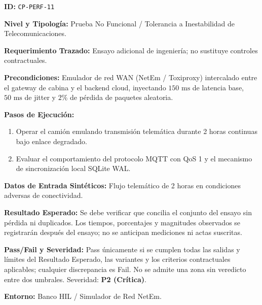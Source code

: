 \par\noindent\textbf{ID:} \texttt{C\allowbreak{}P\allowbreak{}-\allowbreak{}P\allowbreak{}E\allowbreak{}R\allowbreak{}F\allowbreak{}-\allowbreak{}1\allowbreak{}1\allowbreak{}}\par
\par\noindent\textbf{Nivel y Tipología:} Prueba No Funcional / Tolerancia a Inestabilidad de Telecomunicaciones.\par
\par\noindent\textbf{Requerimiento Trazado:} Ensayo adicional de ingeniería; no sustituye controles contractuales.\par
\par\noindent\textbf{Precondiciones:} Emulador de red WAN (NetEm / Toxiproxy) intercalado entre el gateway de cabina y el backend cloud, inyectando \(150\text{ ms}\) de latencia base, \(50\text{ ms}\) de jitter y \(2\%\) de pérdida de paquetes aleatoria.\par
\par\noindent\textbf{Pasos de Ejecución:} \par
\begin{enumerate}
\item Operar el camión emulando transmisión telemática durante 2 horas continuas bajo enlace degradado.
\item Evaluar el comportamiento del protocolo MQTT con QoS 1 y el mecanismo de sincronización local SQLite WAL.
\end{enumerate}
\par\noindent\textbf{Datos de Entrada Sintéticos:} Flujo telemático de 2 horas en condiciones adversas de conectividad.\par
\par\noindent\textbf{Resultado Esperado:} Se debe verificar que concilia el conjunto del ensayo sin pérdida ni duplicados. Los tiempos, porcentajes y magnitudes observados se registrarán después del ensayo; no se anticipan mediciones ni actas suscritas.\par
\par\noindent\textbf{Pass/Fail y Severidad:} Pass únicamente si se cumplen todas las salidas y límites del Resultado Esperado, las variantes y los criterios contractuales aplicables; cualquier discrepancia es Fail. No se admite una zona sin veredicto entre dos umbrales. Severidad: \textbf{P2 (Crítica)}.\par
\par\noindent\textbf{Entorno:} Banco HIL / Simulador de Red NetEm.\par






